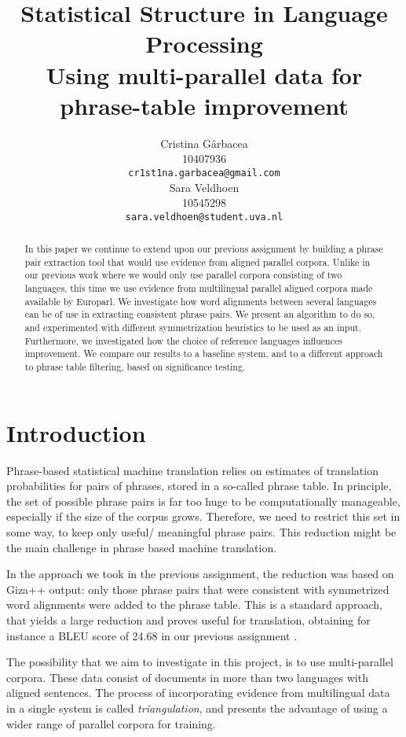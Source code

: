 \documentclass[11pt]{article}
\title{Statistical Structure in Language Processing \\Using multi-parallel data for phrase-table improvement}
\author{ Cristina G\^arbacea\\
  10407936 \\
  {\small \tt cr1st1na.garbacea@gmail.com} 
  \\\And
  Sara Veldhoen \\
10545298   \\
  {\small \tt sara.veldhoen@student.uva.nl} \\}
\date{}
\begin{document}
\maketitle

\begin{abstract}
In this paper we continue to extend upon our previous assignment by building a phrase pair extraction tool that would use evidence from aligned parallel corpora. Unlike in our previous work where we would only use parallel corpora consisting of two languages, this time we use evidence from multilingual parallel aligned corpora made available by Europarl. We investigate how word alignments between several languages can be of use in extracting consistent phrase pairs. %
We present an algorithm to do so, and experimented with different symmetrization heuristics to be used as an input. Furthermore, we investigated how the choice of reference languages influences improvement. We compare our results to a baseline system, and to a different approach to phrase table filtering, based on significance testing.
\end{abstract}

\section{Introduction}
Phrase-based statistical machine translation relies on estimates of translation probabilities for pairs of phrases, stored in a so-called phrase table.
In principle, the set of possible phrase pairs is far too huge to be computationally manageable, especially if the size of the corpus grows.
Therefore, we need to restrict this set in some way, to keep only useful/ meaningful phrase pairs. This reduction might be the main challenge in phrase based machine translation.

In the approach we took in the previous assignment, the reduction was based on Giza++ output: only those phrase pairs that were consistent with symmetrized word alignments were added to the phrase table. This is a standard approach, that yields a large reduction and proves useful for translation, obtaining for instance a BLEU score of 24.68 in our previous assignment \cite{previous}.

The possibility that we aim to investigate in this project, is to use multi-parallel corpora. These data consist of documents in more than two languages with aligned sentences. The process of incorporating evidence from multilingual data in a single system is called \emph{triangulation}, and presents the advantage of using a wider range of parallel corpora for training. 
\end{document}
